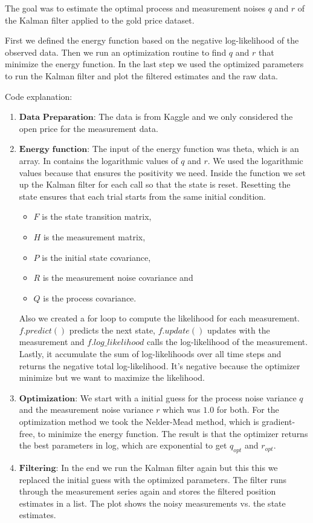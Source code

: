 \newpage
The goal was to estimate the optimal process and measurement noises $q$ and $r$ of the Kalman filter applied to the gold price dataset. 

First we defined the energy function based on the negative log-likelihood of the observed data. Then we run an optimization routine to find $q$ and $r$ that minimize the energy function. In the last step we used the optimized parameters to run the Kalman filter and plot the filtered estimates and the raw data. 

Code explanation: 
\begin{enumerate}
    \item $\textbf{Data Preparation}$: The data is from Kaggle and we only considered the open price for the measurement data. 
    \item $\textbf{Energy function}$: The input of the energy function was theta, which is an array. In contains the logarithmic values of $q$ and $r$. We used the logarithmic values because that ensures the positivity we need. Inside the function we set up the Kalman filter for each call so that the state is reset. Resetting the state ensures that each trial starts from the same initial condition.
    \begin{itemize}
        \item $F$ is the state transition matrix,
        \item $H$ is the measurement matrix,
        \item $P$ is the initial state covariance,
        \item $R$ is the measurement noise covariance and
        \item $Q$ is the process covariance.
    \end{itemize}
    Also we created a for loop to compute the likelihood for each measurement. $f.predict()$ predicts the next state, $f.update()$ updates with the measurement and $f.log\_likelihood$ calls the log-likelihood of the measurement. Lastly, it accumulate the sum of log-likelihoods over all time steps and returns the negative total log-likelihood. It's negative because the optimizer minimize but we want to maximize the likelihood.
    \item $\textbf{Optimization}$: We start with a initial guess for the process noise variance $q$ and the measurement noise variance $r$ which was $1.0$ for both. For the optimization method we took the Nelder-Mead method, which is gradient-free, to minimize the energy function. The result is that the optimizer returns the best parameters in log, which are exponential to get $q_{opt}$ and $r_{opt}$.
    \item $\textbf{Filtering}$: In the end we run the Kalman filter again but this this we replaced the initial guess with the optimized parameters. The filter runs through the measurement series again and stores the filtered position estimates in a list. The plot shows the noisy measurements vs. the state estimates. 
\end{enumerate}


